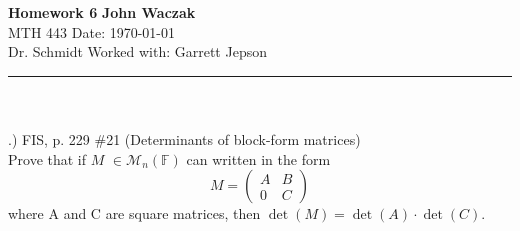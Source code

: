 \documentclass[a4paper, 11pt]{article}
\newcommand{\F}{\mathbb{F}}
\begin{document}
\noindent
\large\textbf{Homework 6} \hfill \textbf{John Waczak} \\
\normalsize MTH 443 \hfill  Date: \today \\
Dr. Schmidt \hfill Worked with: Garrett Jepson 
\par\noindent\rule{\textwidth}{0.4pt} \\\\

.) FIS, p. 229 \#21 (Determinants of block-form matrices) \\
\noindent Prove that if $M$ $\in\mathcal{M}_n(\F)$ can written in the form
\begin{equation*}
  M = \begin{pmatrix} A & B \\ 0 & C \end{pmatrix}
\end{equation*}
where A and C are square matrices, then $\det(M)=\det(A)\cdot\det(C)$.\\
\end{document}
